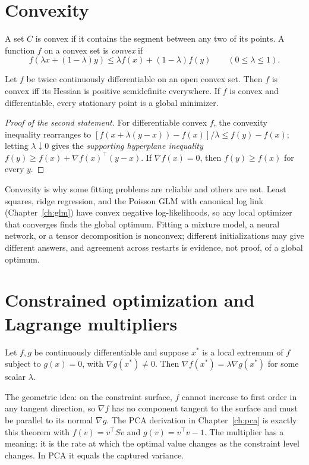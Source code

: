 \section{Convexity}
A set $C$ is convex if it contains the segment between any two of its points. A function $f$ on a convex set is \emph{convex} if
\[
f(\lambda x+(1-\lambda)y)\le\lambda f(x)+(1-\lambda)f(y)\qquad(0\le\lambda\le1).
\]
\begin{theorem}
Let $f$ be twice continuously differentiable on an open convex set. Then $f$ is convex iff its Hessian is positive semidefinite everywhere. If $f$ is convex and differentiable, every stationary point is a global minimizer.
\end{theorem}
\begin{proof}[Proof of the second statement]
For differentiable convex $f$, the convexity inequality rearranges to $[f(x+\lambda(y-x))-f(x)]/\lambda\le f(y)-f(x)$; letting $\lambda\downarrow0$ gives the \emph{supporting hyperplane inequality} $f(y)\ge f(x)+\nabla f(x)^\top(y-x)$. If $\nabla f(x)=0$, then $f(y)\ge f(x)$ for every $y$.
\end{proof}
Convexity is why some fitting problems are reliable and others are not. Least squares, ridge regression, and the Poisson GLM with canonical log link (Chapter~\ref{ch:glm}) have convex negative log-likelihoods, so any local optimizer that converges finds the global optimum. Fitting a mixture model, a neural network, or a tensor decomposition is nonconvex; different initializations may give different answers, and agreement across restarts is evidence, not proof, of a global optimum.

\section{Constrained optimization and Lagrange multipliers}
\begin{theorem}
Let $f,g$ be continuously differentiable and suppose $x^\ast$ is a local extremum of $f$ subject to $g(x)=0$, with $\nabla g(x^\ast)\ne0$. Then $\nabla f(x^\ast)=\lambda\nabla g(x^\ast)$ for some scalar $\lambda$.
\end{theorem}
The geometric idea: on the constraint surface, $f$ cannot increase to first order in any tangent direction, so $\nabla f$ has no component tangent to the surface and must be parallel to its normal $\nabla g$. The PCA derivation in Chapter~\ref{ch:pca} is exactly this theorem with $f(v)=v^\top Sv$ and $g(v)=v^\top v-1$. The multiplier has a meaning: it is the rate at which the optimal value changes as the constraint level changes. In PCA it equals the captured variance.


